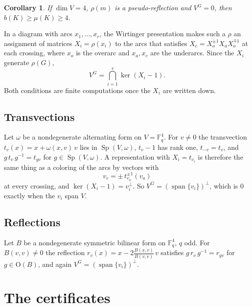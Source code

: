 \documentclass[11pt]{amsart}
\newtheorem{corollary}[theorem]{Corollary}
\theoremstyle{definition}
\theoremstyle{remark}
\newcommand{\F}{\mathbb{F}}
\DeclareMathOperator{\Sp}{Sp}
\renewcommand{\O}{\mathrm{O}}
\begin{document}
\begin{corollary}\label{cor:four}
If $\dim V=4$, $\rho(m)$ is a pseudo-reflection and $V^G=0$, then $b(K)\ge\mu(K)\ge4$.
\end{corollary}

In a diagram with arcs $x_1,\dots,x_r$, the Wirtinger presentation makes such a $\rho$ an
assignment of matrices $X_i=\rho(x_i)$ to the arcs that satisfies
$X_c=X_o^{\pm1}X_aX_o^{\mp1}$ at each crossing, where $x_o$ is the overarc and $x_a,x_c$
are the underarcs. Since the $X_i$ generate $\rho(G)$,
\[
V^G=\bigcap_{i=1}^{r}\ker(X_i-1).
\]
Both conditions are finite computations once the $X_i$ are written down.

\subsection*{Transvections}
Let $\omega$ be a nondegenerate alternating form on $V=\F_q^4$. For $v\ne0$ the
transvection $t_v(x)=x+\omega(x,v)\,v$ lies in $\Sp(V,\omega)$, $t_v-1$ has rank one,
$t_{-v}=t_v$, and $g\,t_v\,g^{-1}=t_{gv}$ for $g\in\Sp(V,\omega)$. A representation with
$X_i=t_{v_i}$ is therefore the same thing as a coloring of the arcs by vectors with
\[
v_c=\pm\,t_{v_o}^{\pm1}(v_a)
\]
at every crossing, and $\ker(X_i-1)=v_i^{\perp}$. So
$V^G=(\operatorname{span}\{v_i\})^{\perp}$, which is $0$ exactly when the $v_i$ span $V$.

\subsection*{Reflections}
Let $B$ be a nondegenerate symmetric bilinear form on $\F_q^4$, $q$ odd. For $B(v,v)\ne0$
the reflection $r_v(x)=x-2\frac{B(x,v)}{B(v,v)}\,v$ satisfies $g\,r_v\,g^{-1}=r_{gv}$ for
$g\in\O(B)$, and again $V^G=(\operatorname{span}\{v_i\})^{\perp}$.

\section{The certificates}\label{sec:cert}
\end{document}
